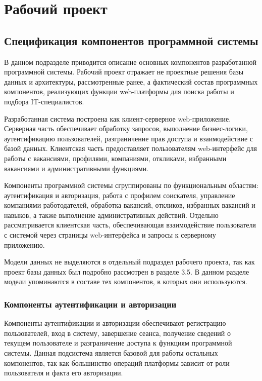 \section{Рабочий проект}

\subsection{Спецификация компонентов программной системы}

В данном подразделе приводится описание основных компонентов разработанной программной системы. Рабочий проект отражает не проектные решения базы данных и архитектуры, рассмотренные ранее, а фактический состав программных компонентов, реализующих функции web-платформы для поиска работы и подбора IT-специалистов.

Разработанная система построена как клиент-серверное web-приложение. Серверная часть обеспечивает обработку запросов, выполнение бизнес-логики, аутентификацию пользователей, разграничение прав доступа и взаимодействие с базой данных. Клиентская часть предоставляет пользователям web-интерфейс для работы с вакансиями, профилями, компаниями, откликами, избранными вакансиями и административными функциями.

Компоненты программной системы сгруппированы по функциональным областям: аутентификация и авторизация, работа с профилем соискателя, управление компаниями работодателей, обработка вакансий, откликов, избранных вакансий и навыков, а также выполнение административных действий. Отдельно рассматривается клиентская часть, обеспечивающая взаимодействие пользователя с системой через страницы web-интерфейса и запросы к серверному приложению.

Модели данных не выделяются в отдельный подраздел рабочего проекта, так как проект базы данных был подробно рассмотрен в разделе 3.5. В данном разделе модели упоминаются в составе тех компонентов, в которых они используются.

\subsubsection{Компоненты аутентификации и авторизации}

Компоненты аутентификации и авторизации обеспечивают регистрацию пользователей, вход в систему, завершение сеанса, получение сведений о текущем пользователе и разграничение доступа к функциям программной системы. Данная подсистема является базовой для работы остальных компонентов, так как большинство операций платформы зависит от роли пользователя и факта его авторизации.

